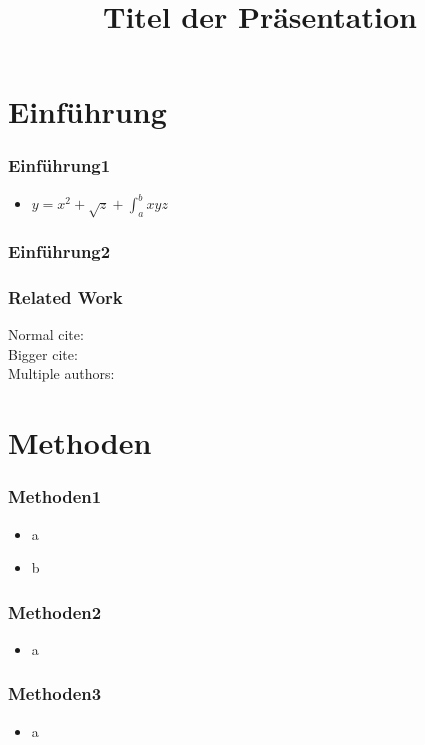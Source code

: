 \documentclass[student, noshadow, lsr, aspectratio=169]{ITR_LSR_slides}
\title{Titel der Präsentation}
\begin{document}
\begin{frame}
    \titlepage
\end{frame}


\section{Einführung}

\begin{frame}
	\frametitle{Einführung1}
	\begin{itemize}
 		\item $y=x^2+\sqrt{z}+\int_{a}^{b}{xyz}$
	\end{itemize}
\end{frame}

\begin{frame}
	\frametitle{Einführung2}


\end{frame}

\begin{frame}
	\frametitle{Related Work}
    Normal cite: \cite{8242464}\\
	Bigger cite: \\
	Multiple  authors: \cite[3]{bauer09}
\end{frame}

\section{Methoden}

\begin{frame}
	\frametitle{Methoden1}
	\begin{itemize}
		\item a
		\item b
	\end{itemize}
\end{frame}

\begin{frame}
	\frametitle{Methoden2}
	\begin{itemize}
		\item a
	\end{itemize}
\end{frame}

\begin{frame}
	\frametitle{Methoden3}
	\begin{itemize}
		\item a
	\end{itemize}
\end{frame}
\end{document}
